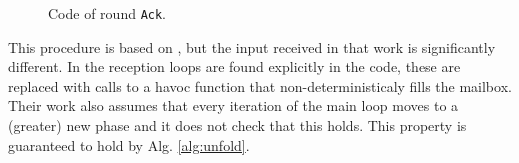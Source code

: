 \begin{figure}[h]
\renewcommand{\ttdefault}{pcr}

\caption{Code of round \texttt{Ack}.}
\label{roundcode}
\end{figure}

This procedure is based on \cite{damian_communication-closed_2019}, but the input received in that work is significantly different. In \cite{damian_communication-closed_2019} the reception loops are found explicitly in the code, these are replaced with calls to a havoc function that non-deterministicaly fills the mailbox. Their work also assumes that every iteration of the main loop moves to a (greater) new phase and it does not check that this holds. This property is guaranteed to hold by Alg. \ref{alg:unfold}.